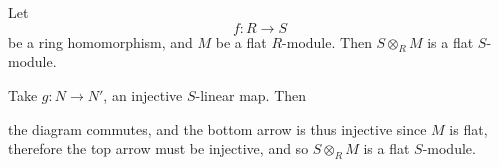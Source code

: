 \documentclass{article}
\begin{document}
\endproof
\begin{fancyprop}{}
    Let \[ f:R \to S\] be a ring homomorphism, and $M$ be a flat $R$-module. Then $S \otimes_{R} M$ is a flat $S$-module.
\end{fancyprop}
\proof Take $g : N \to N'$, an injective $S$-linear map. Then \begin{center}
\end{center}
the diagram commutes, and the bottom arrow is thus injective since $M$ is flat, therefore the top arrow must be injective, and so $S \otimes_{R} M$ is a flat $S$-module.
\end{document}
